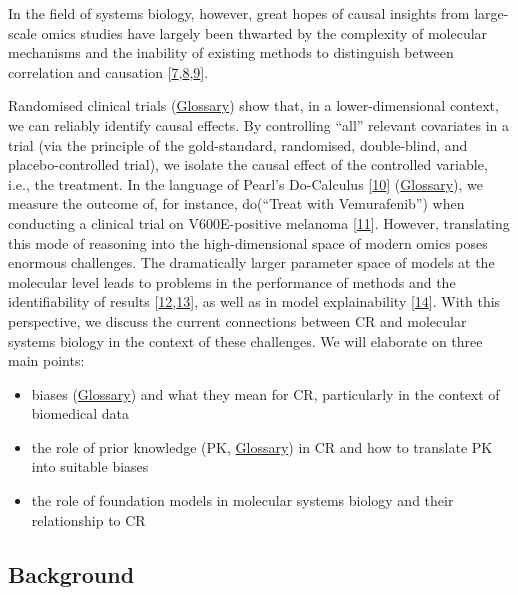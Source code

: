 In the field of systems biology, however, great hopes of causal insights from large-scale omics studies have largely been thwarted by the complexity of molecular mechanisms and the inability of existing methods to distinguish between correlation and causation {[}\protect\hyperlink{ref-IxBIB6CT}{7},\protect\hyperlink{ref-17kSbeSiE}{8},\protect\hyperlink{ref-17scpieH5}{9}{]}.

Randomised clinical trials (\protect\hyperlink{randomized-clinical-trials}{Glossary}) show that, in a lower-dimensional context, we can reliably identify causal effects.
By controlling ``all'' relevant covariates in a trial (via the principle of the gold-standard, randomised, double-blind, and placebo-controlled trial), we isolate the causal effect of the controlled variable, i.e., the treatment.
In the language of Pearl's Do-Calculus {[}\protect\hyperlink{ref-12GOinshI}{10}{]} (\protect\hyperlink{pearls-do-calculus}{Glossary}), we measure the outcome of, for instance, do(``Treat with Vemurafenib'') when conducting a clinical trial on V600E-positive melanoma {[}\protect\hyperlink{ref-muFRX2ZL}{11}{]}.
However, translating this mode of reasoning into the high-dimensional space of modern omics poses enormous challenges.
The dramatically larger parameter space of models at the molecular level leads to problems in the performance of methods and the identifiability of results {[}\protect\hyperlink{ref-3e4s1VLp}{12},\protect\hyperlink{ref-15RkhPQiZ}{13}{]}, as well as in model explainability {[}\protect\hyperlink{ref-18RVn064W}{14}{]}.
With this perspective, we discuss the current connections between CR and molecular systems biology in the context of these challenges.
We will elaborate on three main points:

\begin{itemize}
\item
  biases (\protect\hyperlink{bias-machine-learning}{Glossary}) and what they mean for CR, particularly in the context of biomedical data
\item
  the role of prior knowledge (PK, \protect\hyperlink{prior-knowledge-1}{Glossary}) in CR and how to translate PK into suitable biases
\item
  the role of foundation models in molecular systems biology and their relationship to CR
\end{itemize}

\hypertarget{background}{%
\subsection{Background}\label{background}}

